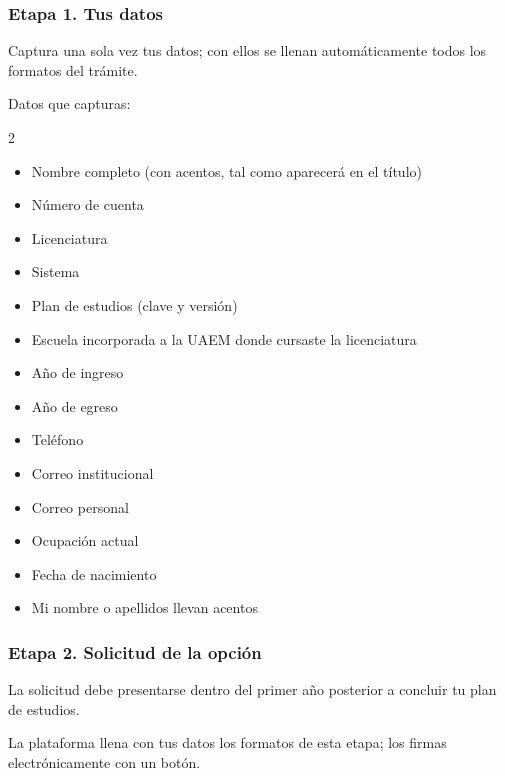 \subsubsection*{Etapa 1. Tus datos}
Captura una sola vez tus datos; con ellos se llenan automáticamente todos los formatos del trámite.

Datos que capturas:
\begin{multicols}{2}\small
\begin{itemize}
  \item Nombre completo (con acentos, tal como aparecerá en el título)
  \item Número de cuenta
  \item Licenciatura
  \item Sistema
  \item Plan de estudios (clave y versión)
  \item Escuela incorporada a la UAEM donde cursaste la licenciatura
  \item Año de ingreso
  \item Año de egreso
  \item Teléfono
  \item Correo institucional
  \item Correo personal
  \item Ocupación actual
  \item Fecha de nacimiento
  \item Mi nombre o apellidos llevan acentos
\end{itemize}
\end{multicols}
\subsubsection*{Etapa 2. Solicitud de la opción}
La solicitud debe presentarse dentro del primer año posterior a concluir tu plan de estudios.

La plataforma llena con tus datos los formatos de esta etapa; los firmas electrónicamente con un botón.

